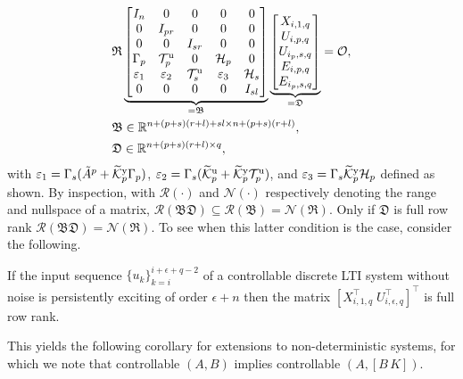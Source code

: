 \begin{align}
    &\mathfrak{R}
    \underbrace{\begin{bmatrix}
        I_n      & 0      & 0       & 0 & 0\\
        0        & I_{pr} & 0       & 0 & 0\\
        0        & 0      & I_{sr}  & 0 & 0\\
        \Gamma_p & \mathcal{T}_p^\mathrm{u} & 0 & \mathcal{H}_p & 0\\
        \varepsilon_1 & \varepsilon_2 & \mathcal{T}_s^\mathrm{u} & \varepsilon_3 & \mathcal{H}_s\\
        0 & 0 & 0 & 0 & I_{sl}
    \end{bmatrix}}_{=\mathfrak{B}}
    \underbrace{\begin{bmatrix}
        X_{i,1,q}\\
        U_{i,p,q}\\
        U_{i_p,s,q}\\
        E_{i,p,q}\\
        E_{i_p,s,q}
    \end{bmatrix}}_{=\mathfrak{D}}=\mathcal{O},\label{eq:RBD2}\\
    &\mathfrak{B}\in\mathbb{R}^{n+(p+s)(r+l)+sl\times n+(p+s)(r+l)},\notag\\
    &\mathfrak{D}\in\mathbb{R}^{n+(p+s)(r+l)\times q},\notag
\end{align}
with $\varepsilon_1=\Gamma_s(\tilde{A}^p+\widetilde{\mathcal{K}}_{p}^{\mathrm{{y}}}\Gamma_p)$, $\varepsilon_2=\Gamma_s(\widetilde{\mathcal{K}}_{p}^{\mathrm{{u}}}+\widetilde{\mathcal{K}}_{p}^{\mathrm{{y}}}\mathcal{T}_p^\mathrm{u})$, and $\varepsilon_3=\Gamma_s\widetilde{\mathcal{K}}_{p}^{\mathrm{{y}}}\mathcal{H}_p$ defined as shown. By inspection, with $\mathcal{R}(\cdot)$ and $\mathcal{N}(\cdot)$ respectively denoting the range and nullspace of a matrix, $\mathcal{R}(\mathfrak{B}\mathfrak{D})\subseteq\mathcal{R}(\mathfrak{B})=\mathcal{N}(\mathfrak{R})$. Only if $\mathfrak{D}$ is full row rank $\mathcal{R}(\mathfrak{B}\mathfrak{D})=\mathcal{N}(\mathfrak{R})$. To see when this latter condition is the case, consider the following.
\setcounter{thm}{0}
\begin{lem}
    If the input sequence $\{u_k\}_{k=i}^{i+\epsilon+q-2}$ of a controllable discrete \ac{LTI} system without noise is persistently exciting of order $\epsilon+n$ then the matrix $\left[X_{i,1,q}^\top\;U_{i,\epsilon,q}^\top\right]^\top$ is full row rank.
\end{lem}
This yields the following corollary for extensions to non-deterministic systems, for which we note that controllable $(A,B)$ implies controllable $(A,[B\,K])$.

